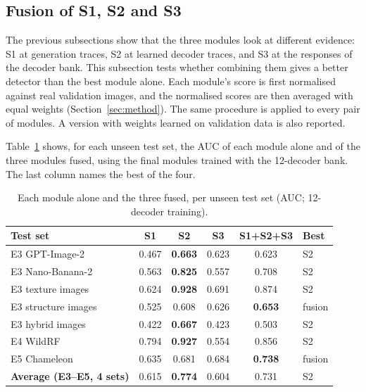 \subsection{Fusion of S1, S2 and S3}
\label{sec:res_fusion}

The previous subsections show that the three modules look at different evidence: S1 at generation traces, S2 at learned decoder traces, and S3 at the responses of the decoder bank. This subsection tests whether combining them gives a better detector than the best module alone. Each module's score is first normalised against real validation images, and the normalised scores are then averaged with equal weights (Section~\ref{sec:method}). The same procedure is applied to every pair of modules. A version with weights learned on validation data is also reported.

Table~\ref{tab:fusion_sets} shows, for each unseen test set, the AUC of each module alone and of the three modules fused, using the final modules trained with the 12-decoder bank. The last column names the best of the four.

\begin{table}[H]
\centering
\small
\caption{Each module alone and the three fused, per unseen test set (AUC; 12-decoder training).}
\label{tab:fusion_sets}
\begin{tabular}{>{\raggedright\arraybackslash}p{3.6cm} cccc l}
\toprule
\textbf{Test set} & \textbf{S1} & \textbf{S2} & \textbf{S3} & \textbf{S1+S2+S3} & \textbf{Best} \\
\midrule
E3 GPT-Image-2 & 0.467 & \textbf{0.663} & 0.623 & 0.623 & S2 \\
E3 Nano-Banana-2 & 0.563 & \textbf{0.825} & 0.557 & 0.708 & S2 \\
E3 texture images & 0.624 & \textbf{0.928} & 0.691 & 0.874 & S2 \\
E3 structure images & 0.525 & 0.608 & 0.626 & \textbf{0.653} & fusion \\
E3 hybrid images & 0.422 & \textbf{0.667} & 0.423 & 0.503 & S2 \\
E4 WildRF & 0.794 & \textbf{0.927} & 0.554 & 0.856 & S2 \\
E5 Chameleon & 0.635 & 0.681 & 0.684 & \textbf{0.738} & fusion \\
\midrule
\textbf{Average (E3--E5, 4 sets)} & 0.615 & \textbf{0.774} & 0.604 & 0.731 & S2 \\
\bottomrule
\end{tabular}
\end{table}

